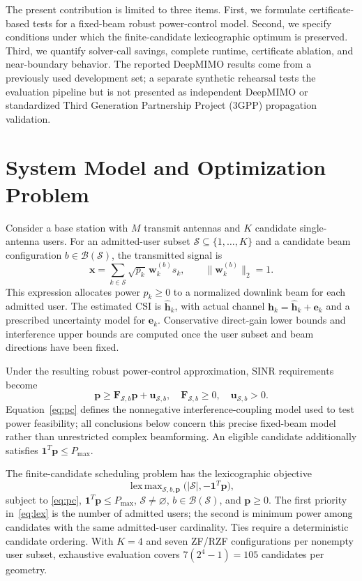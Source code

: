 \documentclass[journal]{IEEEtran}
\begin{document}
The present contribution is limited to three items. First, we formulate certificate-based tests for a fixed-beam robust power-control model. Second, we specify conditions under which the finite-candidate lexicographic optimum is preserved. Third, we quantify solver-call savings, complete runtime, certificate ablation, and near-boundary behavior. The reported DeepMIMO results come from a previously used development set; a separate synthetic rehearsal tests the evaluation pipeline but is not presented as independent DeepMIMO or standardized Third Generation Partnership Project (3GPP) propagation validation.

\section{System Model and Optimization Problem}
Consider a base station with $M$ transmit antennas and $K$ candidate single-antenna users. For an admitted-user subset $\mathcal S\subseteq\{1,\ldots,K\}$ and a candidate beam configuration $b\in\mathcal B(\mathcal S)$, the transmitted signal is
\begin{equation}
 \mathbf x=\sum_{k\in\mathcal S}\sqrt{p_k}\,\mathbf w_k^{(b)}s_k,\qquad \|\mathbf w_k^{(b)}\|_2=1.
\end{equation}
This expression allocates power $p_k\ge0$ to a normalized downlink beam for each admitted user. The estimated CSI is $\widehat{\mathbf h}_k$, with actual channel $\mathbf h_k=\widehat{\mathbf h}_k+\mathbf e_k$ and a prescribed uncertainty model for $\mathbf e_k$. Conservative direct-gain lower bounds and interference upper bounds are computed once the user subset and beam directions have been fixed.

Under the resulting robust power-control approximation, SINR requirements become
\begin{equation}
 \mathbf p\ge\mathbf F_{\mathcal S,b}\mathbf p+\mathbf u_{\mathcal S,b}, \quad \mathbf F_{\mathcal S,b}\ge0,\quad \mathbf u_{\mathcal S,b}>0.
 \label{eq:pc}
\end{equation}
Equation~\eqref{eq:pc} defines the nonnegative interference-coupling model used to test power feasibility; all conclusions below concern this precise fixed-beam model rather than unrestricted complex beamforming. An eligible candidate additionally satisfies $\mathbf1^T\mathbf p\le P_{\max}$.

The finite-candidate scheduling problem has the lexicographic objective
\begin{equation}
 \operatorname{lex\,max}_{\mathcal S,b,\mathbf p}
 \bigl(|\mathcal S|,-\mathbf1^T\mathbf p\bigr),
 \label{eq:lex}
\end{equation}
subject to \eqref{eq:pc}, $\mathbf1^T\mathbf p\le P_{\max}$, $\mathcal S\ne\varnothing$, $b\in\mathcal B(\mathcal S)$, and $\mathbf p\ge0$.
The first priority in~\eqref{eq:lex} is the number of admitted users; the second is minimum power among candidates with the same admitted-user cardinality. Ties require a deterministic candidate ordering. With $K=4$ and seven ZF/RZF configurations per nonempty user subset, exhaustive evaluation covers $7(2^4-1)=105$ candidates per geometry.
\end{document}
